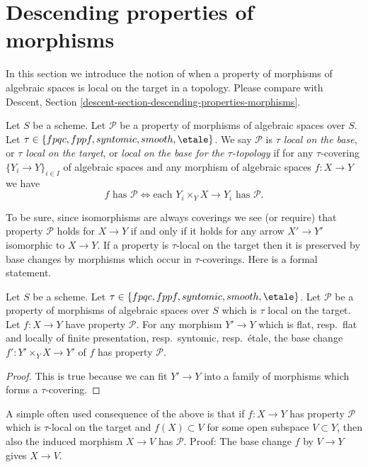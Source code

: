 \section{Descending properties of morphisms}
\label{section-descending-properties-morphisms}

\noindent
In this section we introduce the notion of when a property of morphisms of
algebraic spaces is local on the target in a topology. Please compare with
Descent, Section \ref{descent-section-descending-properties-morphisms}.

\begin{definition}
\label{definition-property-morphisms-local}
Let $S$ be a scheme.
Let $\mathcal{P}$ be a property of morphisms of algebraic spaces over $S$.
Let $\tau \in \{fpqc, fppf, syntomic, smooth, \etale\}$.
We say $\mathcal{P}$ is {\it $\tau$ local on the base}, or
{\it $\tau$ local on the target}, or
{\it local on the base for the $\tau$-topology} if for any
$\tau$-covering $\{Y_i \to Y\}_{i \in I}$ of algebraic spaces
and any morphism of algebraic spaces $f : X \to Y$ we
have
$$
f \text{ has }\mathcal{P}
\Leftrightarrow
\text{each }Y_i \times_Y X \to Y_i\text{ has }\mathcal{P}.
$$
\end{definition}

\noindent
To be sure, since isomorphisms are always coverings
we see (or require) that property $\mathcal{P}$ holds for $X \to Y$
if and only if it holds for any arrow $X' \to Y'$ isomorphic to $X \to Y$.
If a property is $\tau$-local on the target then it is preserved
by base changes by morphisms which occur in $\tau$-coverings. Here
is a formal statement.

\begin{lemma}
\label{lemma-pullback-property-local-target}
Let $S$ be a scheme.
Let $\tau \in \{fpqc, fppf, syntomic, smooth, \etale\}$.
Let $\mathcal{P}$ be a property of morphisms of algebraic spaces over $S$
which is $\tau$ local on the target. Let $f : X \to Y$ have property
$\mathcal{P}$. For any morphism $Y' \to Y$ which is
flat, resp.\ flat and locally of finite presentation, resp.\ syntomic,
resp.\ \'etale, the base change
$f' : Y' \times_Y X \to Y'$ of $f$ has property $\mathcal{P}$.
\end{lemma}

\begin{proof}
This is true because we can fit $Y' \to Y$ into a family of
morphisms which forms a $\tau$-covering.
\end{proof}

\noindent
A simple often used consequence of the above is that if
$f : X \to Y$ has property $\mathcal{P}$ which is $\tau$-local
on the target and $f(X) \subset V$
for some open subspace $V \subset Y$, then also the induced
morphism $X \to V$ has $\mathcal{P}$. Proof: The base change
$f$ by $V \to Y$ gives $X \to V$.

